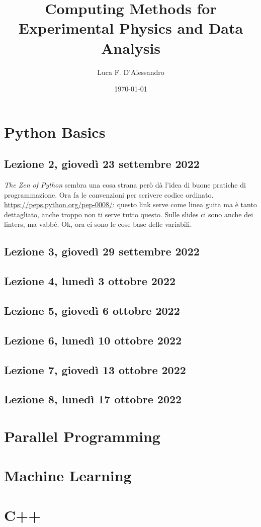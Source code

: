 \documentclass[10pt, a4paper, twosided, titlepage, draft]{book}
\title{Computing Methods for Experimental Physics and Data Analysis}
\author{Luca F. D'Alessandro}
\date{\today}
\begin{document}
\maketitle

\tableofcontents

\chapter{Python Basics}

\section{Lezione 2, giovedì 23 settembre 2022}

\emph{The Zen of Python} sembra una cosa strana però dà l'idea di buone pratiche di programmazione.
Ora fa le convenzioni per scrivere codice ordinato.
\url{https://peps.python.org/pep-0008/}:
questo link serve come linea guita ma è tanto dettagliato, anche troppo non ti serve tutto questo.
Sulle slides ci sono anche dei linters, ma vabbè.
Ok, ora ci sono le cose base delle variabili.


\section{Lezione 3, giovedì 29 settembre 2022}



\section{Lezione 4, lunedì 3 ottobre 2022}



\section{Lezione 5, giovedì 6 ottobre 2022}



\section{Lezione 6, lunedì 10 ottobre 2022}



\section{Lezione 7, giovedì 13 ottobre 2022}



\section{Lezione 8, lunedì 17 ottobre 2022}


\chapter{Parallel Programming}



\chapter{Machine Learning}



\chapter{C++}
\end{document}
